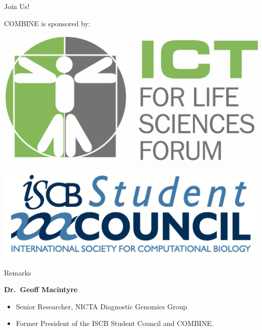 \documentclass[svgnames]{beamer}
\newcommand{\bp}[1]{{\usebeamercolor[fg]{title}#1}}
\begin{document}
\begin{frame}{Join Us!}
    
    COMBINE is sponsored by:\quad
    \begin{minipage}[c]{0.2\linewidth}
        \centering
        \href{http://ict4lifesciences.org.au/}
            {\includegraphics[height=0.1\paperheight]{./images/ICT-for-Life-Sciences-Forum-logo.png}}
    \end{minipage}\quad
    \begin{minipage}[c]{0.25\linewidth}
        \centering
        \href{http://www.iscbsc.org/}{\includegraphics[height=0.1\paperheight]{./images/ISCBSC-logo.png}}
    \end{minipage}
\end{frame}

\begin{frame}{Remarks}

\textbf{\bp{Dr.~Geoff Macintyre}}
\begin{itemize}
    \item Senior Researcher, NICTA Diagnostic Genomics Group
    \item Former President of the ISCB Student Council and COMBINE.
\end{itemize}
\end{frame}
\end{document}
